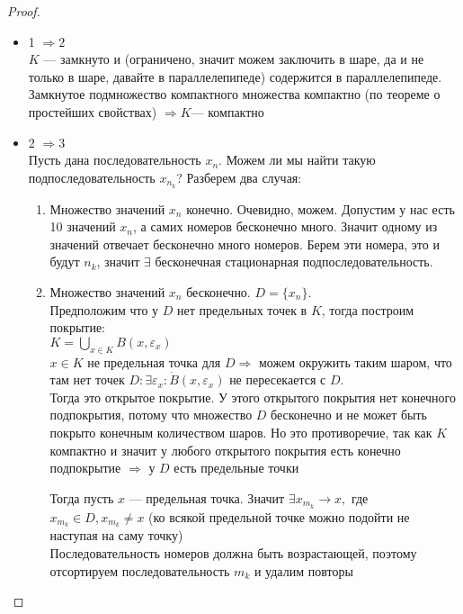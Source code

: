 	\begin{proof} \nobreakspace \\
		\begin{itemize}
		\item 1 $\Rightarrow 2$ \\
	  		 $K$ --- замкнуто и (ограничено, значит можем заключить в шаре, да и не только в шаре, давайте в параллелепипеде) содержится в параллелепипеде. Замкнутое подмножество компактного множества компактно (по теореме о простейших свойствах) $\Rightarrow K$--- компактно \\
	  	\item 2 $\Rightarrow 3$ \\
			Пусть дана последовательность $x_n$. Можем ли мы найти такую подпоследовательность $x_{n_k}$? Разберем два случая:
			\begin{enumerate}
				\item Множество значений $x_n$ конечно. Очевидно, можем. Допустим у нас есть 10 значений $x_n$, а самих номеров бесконечно много. Значит одному из значений отвечает бесконечно много номеров. Берем эти номера, это и будут $n_k$, значит $\exists$ бесконечная стационарная подпоследовательность. 
				\item Множество значений $x_n$ бесконечно. $D = \{ x_n \} $. \\ 
				Предположим что  у $D$ нет предельных точек в $K$, тогда построим покрытие: \\
				$K = \bigcup\limits_{x \in K} B(x, \varepsilon_x)$ \\
				$x \in K$ не предельная точка для $D \Rightarrow$
				 можем окружить таким шаром,  что там нет точек $D: \exists \varepsilon_x : \dot B(x, \varepsilon_x) $ не пересекается с $D$. \\
				Тогда это открытое покрытие. У этого открытого покрытия нет конечного подпокрытия,  потому что множество $D$ бесконечно и не может быть покрыто конечным количеством шаров. Но это противоречие, так как $K$ компактно и значит у любого открытого покрытия есть конечно подпокрытие $\Rightarrow$ у $D$ есть предельные точки
				
				Тогда пусть $x$ --- предельная точка. Значит $\exists x_{m_k} \to x, $ где $x_{m_k} \in D, x_{m_k} \neq x$ (ко всякой предельной точке можно подойти не наступая на саму точку) \\
				Последовательность номеров должна быть возрастающей, поэтому отсортируем последовательность $m_k$ и удалим повторы
		

\end{enumerate}
\end{itemize}
\end{proof}
